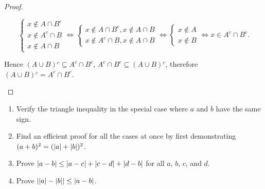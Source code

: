 \documentclass[class=understanding-analysis,crop=false]{standalone}
\begin{document}
\begin{proof}
\begin{enumerate}[label = (\alph*)]
\[\begin{cases}
                    x\notin A\cap B^{c} \\
                    x\notin A^{c}\cap B \\
                    x\notin A\cap B
                \end{cases}
                \Leftrightarrow
                \begin{cases}
                    x\notin A\cap B^{c}, x\notin A\cap B \\
                    x\notin A^{c}\cap B, x\notin A\cap B
                \end{cases}
                \Leftrightarrow
                \begin{cases}
                    x\notin A \\
                    x\notin B
                \end{cases}
                \Leftrightarrow
                x\in A^{c}\cap B^{c}.
            \]
            \par Hence $(A\cup B){}^{c}\subseteq A^{c}\cap B^{c}$, $A^{c}\cap B^{c}\subseteq (A\cup B){}^{c}$, therefore $(A\cup B){}^{c} = A^{c}\cap B^{c}$.
    \end{enumerate}
\end{proof}

\begin{exercise}
    \begin{enumerate}[label = (\alph*)]
        \item Verify the triangle inequality in the special case where $a$ and $b$ have the same sign.
        \item Find an efficient proof for all the cases at once by first demonstrating $(a + b){}^{2} = (\left\vert{a}\right\vert + \left\vert{b}\right\vert){}^{2}$.
        \item Prove $\left\vert{a - b}\right\vert\le \left\vert{a-c}\right\vert + \left\vert{c-d}\right\vert + \left\vert{d-b}\right\vert$ for all $a$, $b$, $c$, and $d$.
        \item Prove $\left\vert{\left\vert{a}\right\vert - \left\vert{b}\right\vert}\right\vert\le \left\vert{a-b}\right\vert$.
    \end{enumerate}
\end{exercise}
\end{document}
